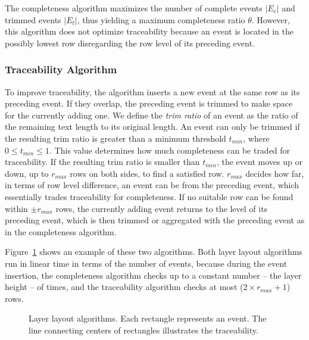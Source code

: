 The completeness algorithm maximizes the number of complete events $|E_c|$ and trimmed events $|E_t|$, thus yielding a maximum completeness ratio $\theta$. However, this algorithm does not optimize traceability because an event is located in the possibly lowest row disregarding the row level of its preceding event.

\subsubsection{Traceability Algorithm}
To improve traceability, the algorithm inserts a new event at the same row as its preceding event. If they overlap, the preceding event is trimmed to make space for the currently adding one. We define the \emph{trim ratio} of an event as the ratio of the remaining text length to its original length. An event can only be trimmed if the resulting trim ratio is greater than a minimum threshold $t_{min}$, where $0\leq t_{min} \leq 1$. This value determines how much completeness can be traded for traceability. If the resulting trim ratio is smaller than $t_{min}$, the event moves up or down, up to $r_{max}$ rows on both sides, to find a satisfied row. $r_{max}$ decides how far, in terms of row level difference, an event can be from the preceding event, which essentially trades traceability for completeness. If no suitable row can be found within $\pm r_{max}$ rows, the currently adding event returns to the level of its preceding event, which is then trimmed or aggregated with the preceding event as in the completeness algorithm.

Figure~\ref{fig:traceability} shows an example of these two algorithms. Both layer layout algorithms run in linear time in terms of the number of events, because during the event insertion, the completeness algorithm checks up to a constant number -- the layer height -- of times, and the traceability algorithm checks at most ($2 \times r_{max}+1$) rows.

\begin{figure}[!htb]
\centering
	\hfill
\caption{Layer layout algorithms. Each rectangle represents an event. The line connecting centers of rectangles illustrates the  traceability.}
\label{fig:traceability}
\end{figure}

